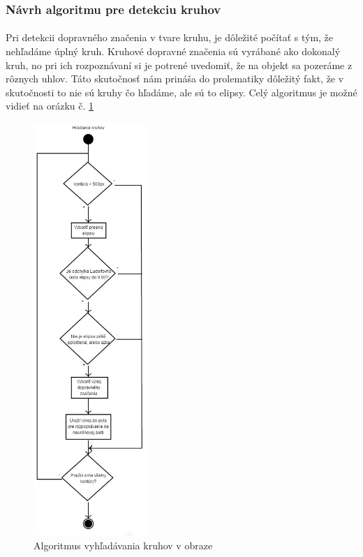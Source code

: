 \documentclass[12pt]{article}
\begin{document}
\subsubsection{Návrh algoritmu pre detekciu kruhov}
\paragraph{}
Pri detekcii dopravného značenia v tvare kruhu, je dôležité počítať s tým, že nehľadáme úplný kruh. Kruhové dopravné značenia sú vyrábané ako dokonalý kruh,
no pri ich rozpoznávaní si je potrené uvedomiť, že na objekt sa pozeráme z rôznych uhlov. Táto skutočnosť nám prináša do prolematiky dôležitý fakt,
že v skutočnosti to nie sú kruhy čo hľadáme, ale sú to elipsy. Celý algoritmus je možné vidieť na orázku č. \ref{hladanie_kruhov}
\begin{figure}[p]
\centering
\includegraphics[width=0.38\textwidth,natwidth=318,natheight=1164]{hladanie_kruhov.jpg}
\vspace{-20pt}
\caption{Algoritmus vyhľadávania kruhov v obraze}
\vspace{-10pt}
\label{hladanie_kruhov}
\end{figure}
\end{document}
